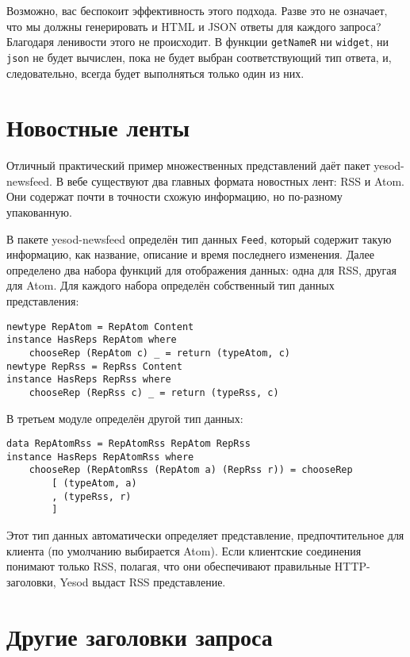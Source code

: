 \begin{remark}
Возможно, вас беспокоит эффективность этого подхода. Разве это не означает, что мы должны
генерировать и HTML и JSON ответы для каждого запроса? Благодаря ленивости этого не
происходит. В функции \lstinline'getNameR' ни \lstinline'widget', ни \lstinline'json' не
будет вычислен, пока не будет выбран соответствующий тип ответа, и, следовательно, всегда
будет выполняться только один из них.
\end{remark}

\section{Новостные ленты}

Отличный практический пример множественных представлений даёт пакет yesod-newsfeed. В вебе существуют два главных формата новостных лент: RSS и Atom. Они содержат почти в точности схожую информацию, но по-разному упакованную.

В пакете yesod-newsfeed определён тип данных \lstinline'Feed', который содержит такую информацию, как название, описание и время последнего изменения. Далее определено два набора функций для отображения данных: одна для RSS, другая для Atom. Для каждого набора определён собственный тип данных представления:

\begin{lstlisting}
newtype RepAtom = RepAtom Content
instance HasReps RepAtom where
    chooseRep (RepAtom c) _ = return (typeAtom, c)
newtype RepRss = RepRss Content
instance HasReps RepRss where
    chooseRep (RepRss c) _ = return (typeRss, c)
\end{lstlisting}

В третьем модуле определён другой тип данных:

\begin{lstlisting}
data RepAtomRss = RepAtomRss RepAtom RepRss
instance HasReps RepAtomRss where
    chooseRep (RepAtomRss (RepAtom a) (RepRss r)) = chooseRep
        [ (typeAtom, a)
        , (typeRss, r)
        ]
\end{lstlisting}

Этот тип данных автоматически определяет представление, предпочтительное для клиента (по умолчанию выбирается Atom). Если клиентские соединения понимают только RSS, полагая, что они обеспечивают правильные HTTP-заголовки, Yesod выдаст RSS представление.

\section{Другие заголовки запроса}

